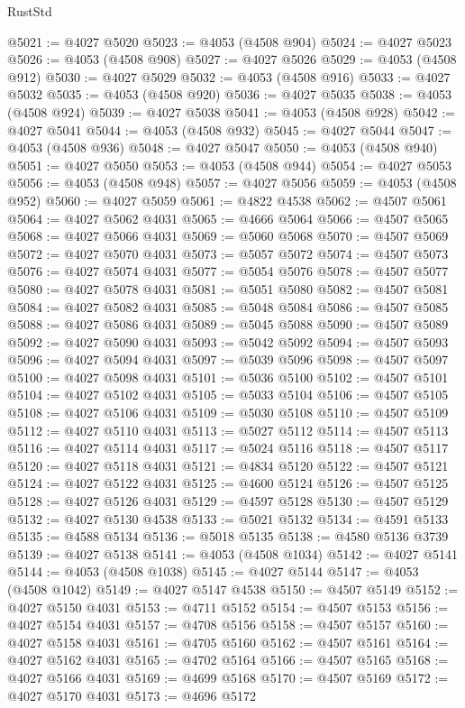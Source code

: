 \begin{lexlean}{RustStd}
\begin{coremodule}
@5021 := @4027 @5020
@5023 := @4053 (@4508 @904)
@5024 := @4027 @5023
@5026 := @4053 (@4508 @908)
@5027 := @4027 @5026
@5029 := @4053 (@4508 @912)
@5030 := @4027 @5029
@5032 := @4053 (@4508 @916)
@5033 := @4027 @5032
@5035 := @4053 (@4508 @920)
@5036 := @4027 @5035
@5038 := @4053 (@4508 @924)
@5039 := @4027 @5038
@5041 := @4053 (@4508 @928)
@5042 := @4027 @5041
@5044 := @4053 (@4508 @932)
@5045 := @4027 @5044
@5047 := @4053 (@4508 @936)
@5048 := @4027 @5047
@5050 := @4053 (@4508 @940)
@5051 := @4027 @5050
@5053 := @4053 (@4508 @944)
@5054 := @4027 @5053
@5056 := @4053 (@4508 @948)
@5057 := @4027 @5056
@5059 := @4053 (@4508 @952)
@5060 := @4027 @5059
@5061 := @4822 @4538
@5062 := @4507 @5061
@5064 := @4027 @5062 @4031
@5065 := @4666 @5064
@5066 := @4507 @5065
@5068 := @4027 @5066 @4031
@5069 := @5060 @5068
@5070 := @4507 @5069
@5072 := @4027 @5070 @4031
@5073 := @5057 @5072
@5074 := @4507 @5073
@5076 := @4027 @5074 @4031
@5077 := @5054 @5076
@5078 := @4507 @5077
@5080 := @4027 @5078 @4031
@5081 := @5051 @5080
@5082 := @4507 @5081
@5084 := @4027 @5082 @4031
@5085 := @5048 @5084
@5086 := @4507 @5085
@5088 := @4027 @5086 @4031
@5089 := @5045 @5088
@5090 := @4507 @5089
@5092 := @4027 @5090 @4031
@5093 := @5042 @5092
@5094 := @4507 @5093
@5096 := @4027 @5094 @4031
@5097 := @5039 @5096
@5098 := @4507 @5097
@5100 := @4027 @5098 @4031
@5101 := @5036 @5100
@5102 := @4507 @5101
@5104 := @4027 @5102 @4031
@5105 := @5033 @5104
@5106 := @4507 @5105
@5108 := @4027 @5106 @4031
@5109 := @5030 @5108
@5110 := @4507 @5109
@5112 := @4027 @5110 @4031
@5113 := @5027 @5112
@5114 := @4507 @5113
@5116 := @4027 @5114 @4031
@5117 := @5024 @5116
@5118 := @4507 @5117
@5120 := @4027 @5118 @4031
@5121 := @4834 @5120
@5122 := @4507 @5121
@5124 := @4027 @5122 @4031
@5125 := @4600 @5124
@5126 := @4507 @5125
@5128 := @4027 @5126 @4031
@5129 := @4597 @5128
@5130 := @4507 @5129
@5132 := @4027 @5130 @4538
@5133 := @5021 @5132
@5134 := @4591 @5133
@5135 := @4588 @5134
@5136 := @5018 @5135
@5138 := @4580 @5136 @3739
@5139 := @4027 @5138
@5141 := @4053 (@4508 @1034)
@5142 := @4027 @5141
@5144 := @4053 (@4508 @1038)
@5145 := @4027 @5144
@5147 := @4053 (@4508 @1042)
@5149 := @4027 @5147 @4538
@5150 := @4507 @5149
@5152 := @4027 @5150 @4031
@5153 := @4711 @5152
@5154 := @4507 @5153
@5156 := @4027 @5154 @4031
@5157 := @4708 @5156
@5158 := @4507 @5157
@5160 := @4027 @5158 @4031
@5161 := @4705 @5160
@5162 := @4507 @5161
@5164 := @4027 @5162 @4031
@5165 := @4702 @5164
@5166 := @4507 @5165
@5168 := @4027 @5166 @4031
@5169 := @4699 @5168
@5170 := @4507 @5169
@5172 := @4027 @5170 @4031
@5173 := @4696 @5172

\end{coremodule}
\end{lexlean}
